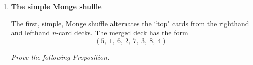 \begin{itemize}
  \begin{enumerate}
  \item 
  {\bf The simple Monge shuffle}

\smallskip

The first, simple, Monge shuffle alternates the ``top" cards from the righthand and lefthand $n$-card decks. 
The merged deck has the form
\[ (5, \ 1, \ 6, \ 2, \ 7, \ 3, \ 8, \ 4) \]
%

{\em Prove the following Proposition.}


\end{enumerate}
\end{itemize}
